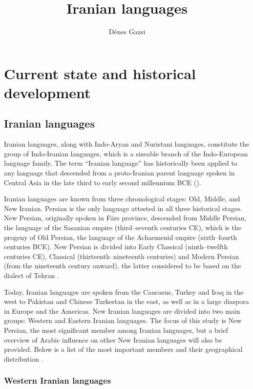 \documentclass[output=paper]{langsci/langscibook}
\author{Dénes Gazsi}
\title{Iranian languages}
\begin{document}
\maketitle 

\section{Current state and historical development}

\subsection{Iranian languages}

Iranian languages, along with Indo-Aryan and Nuristani languages, constitute the group of Indo-Iranian languages, which is a sizeable branch of the Indo-European language family. The term ``Iranian language'' has historically been applied to any language that descended from a proto-Iranian parent language spoken in Central Asia in the late third to early second millennium BCE (\citealt{Skjærvø2012}).

Iranian languages are known from three chronological stages: Old, Middle, and New Iranian. Persian is the only language attested in all three historical stages. New Persian, originally spoken in Fārs province, descended from Middle Persian, the language of the Sasanian empire (third–seventh centuries CE), which is the progeny of Old Persian, the language of the Achaemenid empire (sixth–fourth centuries BCE). New Persian is divided into Early Classical (ninth–twelfth centuries CE), Classical (thirteenth–nineteenth centuries) and Modern Persian (from the nineteenth century onward), the latter considered to be based on the dialect of Tehran \citep[427]{Jeremiás2003}. 

Today, Iranian languages are spoken from the Caucasus, Turkey and Iraq in the west to Pakistan and Chinese Turkestan in the east, as well as in a large diaspora in Europe and the Americas. New Iranian languages are divided into two main groups: Western and Eastern Iranian languages. The focus of this study is New Persian, the most significant member among Iranian languages, but a brief overview of Arabic influence on other New Iranian languages will also be provided. Below is a list of the most important members and their geographical distribution \citep[246]{Schmitt1989}.


\subsubsection{Western Iranian languages}
\end{document}
